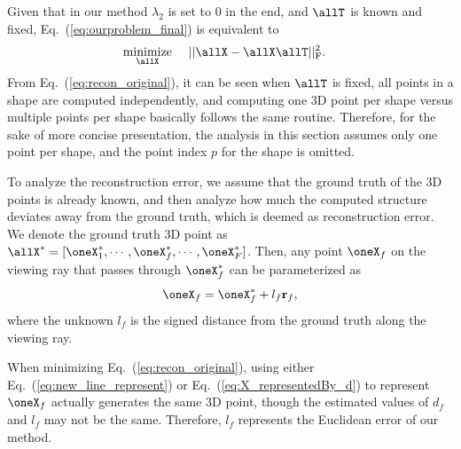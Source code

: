 Given that in our method $\lambda_2$ is set to 0 in the end, and $\allT$ is known and fixed, Eq.~(\ref{eq:ourproblem_final}) is equivalent to
\begin{equation}
\begin{aligned}
& \underset{\allX}{\text{minimize}}&& ~ || \allX - \allX\allT||_\text{F}^2 . 
\end{aligned}
\label{eq:recon_original}
\end{equation}
From Eq.~(\ref{eq:recon_original}), it can be seen when $\allT$ is fixed, all points in a shape are computed independently, and computing one 3D point per shape versus multiple points per shape basically follows the same routine. 
Therefore, for the sake of more concise presentation, the analysis in this section assumes only one point per shape, and the point index $p$ for the shape is omitted.

To analyze the reconstruction error, we assume that the ground truth of the 3D points is already known, and then analyze how much the computed structure deviates away from the ground truth, which is deemed as reconstruction error.
We denote the ground truth 3D point as
$\allX^*=[\oneX_1^*, \cdots, \oneX_f^*,  \cdots, \oneX_F^*]$. 
Then, any point $\oneX_f$ on the viewing ray that passes through $\oneX^*_f$ can be parameterized as 
\begin{equation}
\oneX_f = \oneX^*_f + l_f \mathbf{r}_f,
\label{eq:new_line_represent}
\end{equation}
where the unknown $l_f$ is the signed distance from the ground truth along the viewing ray. 

When minimizing Eq.~(\ref{eq:recon_original}), using either Eq.~(\ref{eq:new_line_represent}) or Eq.~(\ref{eq:X_representedBy_d}) to represent $\oneX_f$ actually 
generates the same 3D point, though the estimated values of $d_f$ and $l_f$ may not be the same. 
Therefore, $l_f$ represents the Euclidean error of our  method. 

